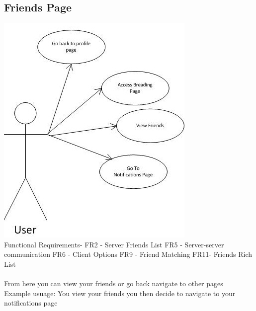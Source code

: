 \documentclass{project}
\begin{document}
\subsection{Friends Page}
\includegraphics[scale=0.6]{FriendsPageUseCase.jpg}
\\
Functional Requirements-
FR2 - Server Friends List
FR5 - Server-server communication
FR6 - Client Options
FR9 - Friend Matching
FR11- Friends Rich List
\\
\\
From here you can view your friends or go back navigate to other pages
\\
Example usuage: You view your friends you then decide to navigate to your notifications page

\newpage
\end{document}
